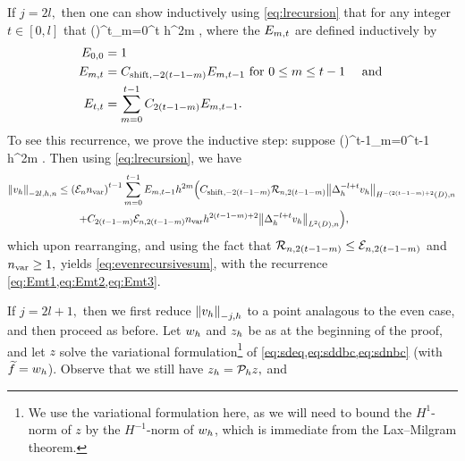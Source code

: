 If $j = 2l,$ then one can show inductively using \cref{eq:lrecursion} that for any integer $t \in [0,l]$ that
\beq\label{eq:evenrecursivesum}
 \leq \mleft(\En\nvar\mright)^t\sum_{m=0}^t  h^{2m}  ,
\eeq
where the $E_{m,t}$ are defined inductively by
\begin{align}
\label{eq:Emt1}E_{0,0} &=1\\
\label{eq:Emt2}E_{m,t} &= C_{\mathrm{shift},-2(t-1-m)} E_{m,t-1} \text{ for } 0 \leq m \leq t-1 \quad\text{ and }\\
\label{eq:Emt3}E_{t,t} &= \sum_{m=0}^{t-1} C_{2(t-1-m)} E_{m,t-1}.
\end{align}
To see this recurrence, we prove the inductive step: suppose
\beqs
{} \leq \mleft(\En\nvar\mright)^{t-1}\sum_{m=0}^{t-1}  h^{2m} .
\eeqs
Then using \cref{eq:lrecursion}, we have
\begin{align*}
\Nfn{-2l,h,n}{\vh} &\leq \mleft(\En\nvar\mright)^{t-1}\sum_{m=0}^{t-1} \Efn{m,t-1} h^{2m} \mleft(\Cshiftfn{2(t-1-m)}\shiftn{2(t-1-m)} \NHnfn{-(2(t-1-m)+2}{D}{\Deltah^{-l+t} \vh}\mright.\\
&\quad\quad\mleft.+ \Cfn{2(t-1-m)} \errn{2(t-1-m)} \nvar h^{2(t-1-m)+2} \NLtDn{\Deltah^{-l+t} \vh}\mright),
\end{align*}
which upon rearranging, and using the fact that $\mathcal R_{n,2(t-1-m)} \leq \mathcal E_{n,2(t-1-m)}$ and $n_{\mathrm{var}} \geq 1,$ yields \cref{eq:evenrecursivesum}, with the recurrence \cref{eq:Emt1,eq:Emt2,eq:Emt3}.

If $j=2l+1,$ then we first reduce $\Nfn{-j,h}{\vh}$ to a point analagous to the even case, and then proceed as before. Let $w_{h}$ and $z_{h}$ be as at the beginning of the proof, and let $z$ solve the variational formulation\footnote{We use the variational formulation here, as we will need to bound the $H^1$-norm of $z$ by the $H^{-1}$-norm of $w_{h}$, which is immediate from the Lax--Milgram theorem.}  of \cref{eq:sdeq,eq:sddbc,eq:sdnbc} (with $\widetilde{f} = w_{h}$). Observe that we still have $z_{h} = \mathcal P_{h} z,$ and


